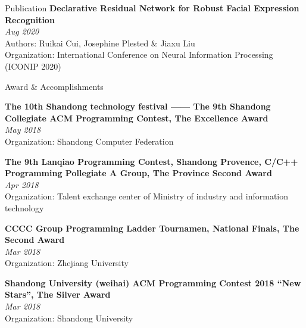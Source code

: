 \documentclass{resume} %
\begin{document}
\begin{rSection}{Publication}
{\bf Declarative Residual Network for Robust Facial Expression Recognition}\\ \hfill {\em Aug 2020}\\
{Authors: Ruikai Cui, Josephine Plested \& Jiaxu Liu}\\
{Organization: International Conference on Neural Information Processing (ICONIP 2020)}
\end{rSection}
\begin{rSection}{Award \& Accomplish­ments}

 
{\bf The 10th Shandong technology festival —— The 9th Shandong Collegiate ACM Programming Contest, The Excellence Award}\\ \hfill {\em May 2018}\\
{Organization: Shandong Computer Federation}

{\bf The 9th Lanqiao Programming Contest, Shandong Provence, C/C++ Programming Pollegiate A Group, The Province Second Award}\\ \hfill {\em Apr 2018}\\
{Organization: Talent exchange center of Ministry of industry and information technology}

{\bf CCCC Group Programming Ladder Tournamen, National Finals, The Second Award}\\ \hfill {\em Mar 2018}\\
{Organization: Zhejiang University}

{\bf Shandong University (weihai) ACM Programming Contest 2018 “New Stars”, The Silver Award}\\ \hfill {\em Mar 2018}\\
{Organization: Shandong University}

\end{rSection}
\end{document}
